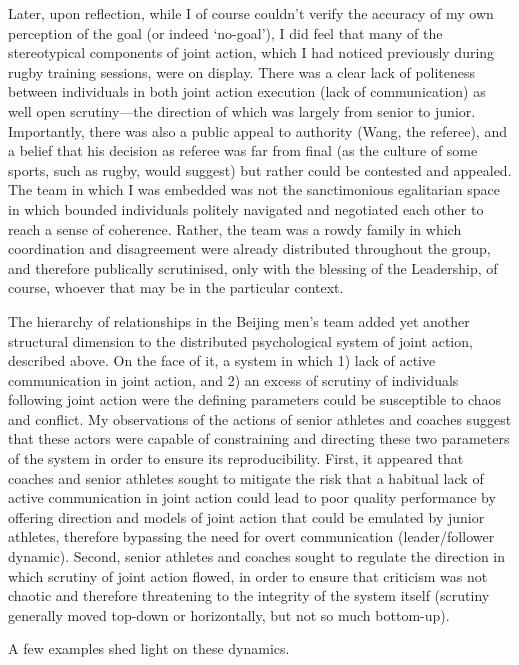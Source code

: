   Later, upon reflection, while I of course couldn't verify the accuracy of my own perception of the goal (or indeed `no-goal'), I did feel that many of the stereotypical components of joint action, which I had noticed previously during rugby training sessions, were on display.  There was a clear lack of politeness between individuals in both joint action execution (lack of communication) as well open scrutiny---the direction of which was largely from senior to junior.  Importantly, there was also a public appeal to authority (Wang, the referee), and a belief that his decision as referee was far from final (as the culture of some sports, such as rugby, would suggest) but rather could be contested and appealed.  The team in which I was embedded was not the sanctimonious egalitarian space in which bounded individuals politely navigated and negotiated each other to reach a sense of coherence.  Rather, the team was a rowdy family in which coordination and disagreement were already distributed throughout the group, and therefore publically scrutinised, only with the blessing of the Leadership, of course, whoever that may be in the particular context.


  The hierarchy of relationships in the Beijing men's team added yet another structural dimension to the distributed psychological system of joint action, described above. On the face of it, a system in which 1) lack of active communication in joint action, and 2) an excess of scrutiny of individuals following joint action were the defining parameters could be susceptible to chaos and conflict.  My observations of the actions of senior athletes and coaches suggest that these actors were capable of constraining and directing these two parameters of the system in order to ensure its reproducibility.   First, it appeared that coaches and senior athletes sought to mitigate the risk that a habitual lack of active communication in joint action could lead to poor quality performance by offering direction and models of joint action that could be emulated by junior athletes, therefore bypassing the need for overt communication (leader/follower dynamic). Second, senior athletes and coaches sought to regulate the direction in which scrutiny of joint action flowed, in order to  ensure that criticism was not chaotic and therefore threatening to the integrity of the system itself (scrutiny generally moved top-down or horizontally, but not so much bottom-up).

  A few examples shed light on these dynamics.

